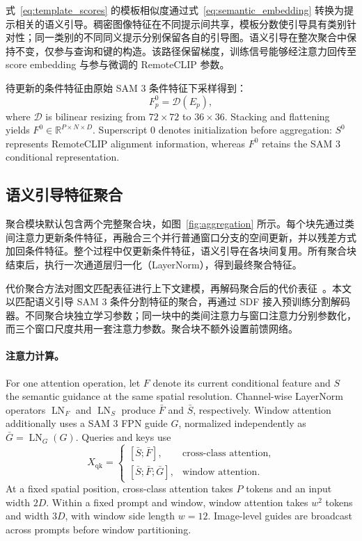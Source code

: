 式~\eqref{eq:template_scores} 的模板相似度通过式~\eqref{eq:semantic_embedding} 转换为提示相关的语义引导。稠密图像特征在不同提示间共享，模板分数使引导具有类别针对性；同一类别的不同同义提示分别保留各自的引导图。语义引导在整次聚合中保持不变，仅参与查询和键的构造。该路径保留梯度，训练信号能够经注意力回传至 score embedding 与参与微调的 RemoteCLIP 参数。

待更新的条件特征由原始 SAM 3 条件特征下采样得到：
\begin{equation}
 F_p^0=\mathcal D(E_p),
 \label{eq:feature_initialization}
\end{equation}
where $\mathcal D$ is bilinear resizing from $72\times72$ to $36\times36$. Stacking and flattening yields $F^0\in\mathbb R^{P\times N\times D}$. Superscript $0$ denotes initialization before aggregation: $S^0$ represents RemoteCLIP alignment information, whereas $F^0$ retains the SAM 3 conditional representation.

\subsection{语义引导特征聚合}
聚合模块默认包含两个完整聚合块，如图~\ref{fig:aggregation} 所示。每个块先通过类间注意力更新条件特征，再融合三个并行普通窗口分支的空间更新，并以残差方式加回条件特征。整个过程中仅更新条件特征，语义引导在各块间复用。所有聚合块结束后，执行一次通道层归一化（LayerNorm），得到最终聚合特征。

代价聚合方法对图文匹配表征进行上下文建模，再解码聚合后的代价表征~\cite{choCATSegCostAggregation2024,liExploringEfficientOpenVocabulary2026}。本文以匹配语义引导 SAM 3 条件分割特征的聚合，再通过 SDF 接入预训练分割解码器。不同聚合块独立学习参数；同一块中的类间注意力与窗口注意力分别参数化，而三个窗口尺度共用一套注意力参数。聚合块不额外设置前馈网络。

\paragraph{注意力计算。}
For one attention operation, let $F$ denote its current conditional feature and $S$ the semantic guidance at the same spatial resolution. Channel-wise LayerNorm operators $\operatorname{LN}_F$ and $\operatorname{LN}_S$ produce $\bar F$ and $\bar S$, respectively. Window attention additionally uses a SAM 3 FPN guide $G$, normalized independently as $\bar G=\operatorname{LN}_G(G)$. Queries and keys use
\begin{equation}
 X_{\mathrm{qk}}=
 \begin{cases}
 [\bar S;\bar F], & \text{cross-class attention},\\
 [\bar S;\bar F;\bar G], & \text{window attention}.
 \end{cases}
 \label{eq:attention_input}
\end{equation}
At a fixed spatial position, cross-class attention takes $P$ tokens and an input width $2D$. Within a fixed prompt and window, window attention takes $w^2$ tokens and width $3D$, with window side length $w=12$. Image-level guides are broadcast across prompts before window partitioning.

